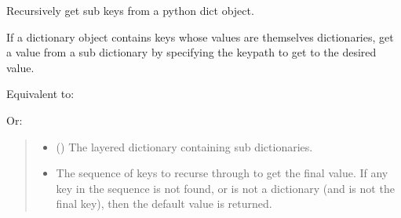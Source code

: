 \documentclass[letterpaper,10pt,english]{sphinxmanual}
\begin{document}
\begin{fulllineitems}
\label{\detokenize{misc:glomar_gridding.io.get_recurse}}
\pysigstartsignatures
\pysiglinewithargsret
{}
{\sphinxparamcomma {}\sphinxparamcomma {}}
{}
\pysigstopsignatures
\sphinxAtStartPar
Recursively get sub keys from a python dict object.

\sphinxAtStartPar
If a dictionary object contains keys whose values are themselves
dictionaries, get a value from a sub dictionary by specifying the key\sphinxhyphen{}path
to get to the desired value.

\sphinxAtStartPar
Equivalent to:

\begin{sphinxVerbatim}[commandchars=\\\{\}]
\PYG{p}{[}\PYG{p}{[}\PYG{p}{]}\PYG{p}{]}\PYG{p}{[}\PYG{p}{[}\PYG{p}{]}\PYG{p}{]}\PYG{p}{[}\PYG{p}{[}\PYG{p}{]}\PYG{p}{]}
\end{sphinxVerbatim}

\sphinxAtStartPar
Or:

\begin{sphinxVerbatim}[commandchars=\\\{\}]
\PYG{p}{[}\PYG{p}{]}\PYG{p}{[}\PYG{p}{]}\PYG{p}{[}\PYG{p}{]}
\end{sphinxVerbatim}
\begin{quote}\begin{description}
\begin{itemize}
\item {}
\sphinxAtStartPar
{} () \textendash{} The layered dictionary containing sub dictionaries.

\item {}
\sphinxAtStartPar
{} \textendash{} The sequence of keys to recurse through to get the final value. If any
key in the sequence is not found, or is not a dictionary (and is not
the final key), then the default value is returned.


\end{itemize}
\end{description}
\end{quote}
\end{fulllineitems}
\end{document}
